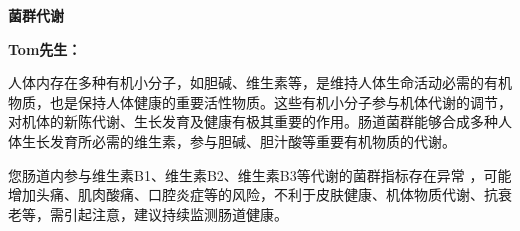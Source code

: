 

\usepackage{graphicx}
\graphicspath{{cores/}}



\setlength{\arrayrulewidth}{0.5pt}
\fontsize{9.3pt}{17pt}\selectfont
\color{gray2}

\vspace*{0mm}
\begin{center}
{\bf\sanhao 菌群代谢}
\end{center}

\medskip
\noindent
{\bf\xiaosihao Tom先生：}

\bigskip

人体内存在多种有机小分子，如胆碱、维生素等，是维持人体生命活动必需的有机物质，也是保持人体健康的重要活性物质。这些有机小分子参与机体代谢的调节，对机体的新陈代谢、生长发育及健康有极其重要的作用。肠道菌群能够合成多种人体生长发育所必需的维生素，参与胆碱、胆汁酸等重要有机物质的代谢。

您肠道内参与维生素B1、维生素B2、维生素B3等代谢的菌群指标存在异常
，可能增加头痛、肌肉酸痛、口腔炎症等的风险，不利于皮肤健康、机体物质代谢、抗衰老等，需引起注意，建议持续监测肠道健康。

